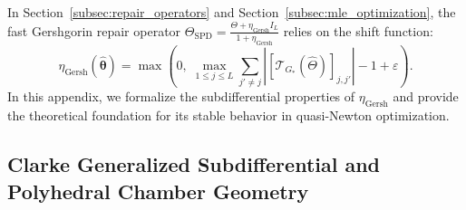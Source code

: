 \documentclass[default,sn-mathphys,Numbered]{sn-jnl}
\theoremstyle{thmstyleone}
\theoremstyle{thmstylethree}
\theoremstyle{thmstyletwo}
\begin{document}
\begin{appendices}
In Section~\ref{subsec:repair_operators} and Section~\ref{subsec:mle_optimization}, the fast Gershgorin repair operator $\Theta_{\mathrm{SPD}} = \frac{\Theta + \eta_{\mathrm{Gersh}} I_L}{1 + \eta_{\mathrm{Gersh}}}$ relies on the shift function:
\begin{equation}
\label{eq:app_eta_gersh}
\eta_{\mathrm{Gersh}}(\hat{\bm{\theta}}) = \max\left(0,\; \max_{1 \le j \le L} \sum_{j' \neq j} |[\mathcal{T}_{G_*}(\hat{\Theta})]_{j, j'}| - 1 + \varepsilon\right).
\end{equation}
In this appendix, we formalize the subdifferential properties of $\eta_{\mathrm{Gersh}}$ and provide the theoretical foundation for its stable behavior in quasi-Newton optimization.

\subsection{Clarke Generalized Subdifferential and Polyhedral Chamber Geometry}


\end{appendices}
\end{document}
